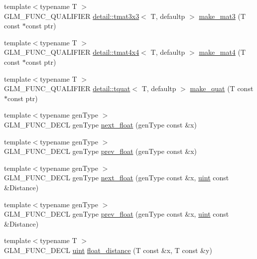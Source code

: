 \begin{DoxyCompactItemize}
\item 
{\footnotesize template$<$typename T $>$ }\\G\+L\+M\+\_\+\+F\+U\+N\+C\+\_\+\+Q\+U\+A\+L\+I\+F\+I\+ER \hyperlink{structglm_1_1detail_1_1tmat3x3}{detail\+::tmat3x3}$<$ T, defaultp $>$ \hyperlink{group__gtc__type__ptr_gae50ecac46eb8771fb074e310b602bf53}{make\+\_\+mat3} (T const $\ast$const ptr)
\item 
{\footnotesize template$<$typename T $>$ }\\G\+L\+M\+\_\+\+F\+U\+N\+C\+\_\+\+Q\+U\+A\+L\+I\+F\+I\+ER \hyperlink{structglm_1_1detail_1_1tmat4x4}{detail\+::tmat4x4}$<$ T, defaultp $>$ \hyperlink{group__gtc__type__ptr_gac3920fd61f0c459a4749b8eb9107982c}{make\+\_\+mat4} (T const $\ast$const ptr)
\item 
{\footnotesize template$<$typename T $>$ }\\G\+L\+M\+\_\+\+F\+U\+N\+C\+\_\+\+Q\+U\+A\+L\+I\+F\+I\+ER \hyperlink{structglm_1_1detail_1_1tquat}{detail\+::tquat}$<$ T, defaultp $>$ \hyperlink{group__gtc__type__ptr_ga051ec24a44af31a08b11eccbf8726b02}{make\+\_\+quat} (T const $\ast$const ptr)
\item 
{\footnotesize template$<$typename gen\+Type $>$ }\\G\+L\+M\+\_\+\+F\+U\+N\+C\+\_\+\+D\+E\+CL gen\+Type \hyperlink{group__gtc__ulp_gae516ae554faa6117660828240e8bdaf0}{next\+\_\+float} (gen\+Type const \&x)
\item 
{\footnotesize template$<$typename gen\+Type $>$ }\\G\+L\+M\+\_\+\+F\+U\+N\+C\+\_\+\+D\+E\+CL gen\+Type \hyperlink{group__gtc__ulp_ga2fcbb7bfbfc595712bfddc51b0715b07}{prev\+\_\+float} (gen\+Type const \&x)
\item 
{\footnotesize template$<$typename gen\+Type $>$ }\\G\+L\+M\+\_\+\+F\+U\+N\+C\+\_\+\+D\+E\+CL gen\+Type \hyperlink{group__gtc__ulp_gad107ec3d9697ef82032a33338a73ebdd}{next\+\_\+float} (gen\+Type const \&x, \hyperlink{group__core__precision_ga4fd29415871152bfb5abd588334147c8}{uint} const \&Distance)
\item 
{\footnotesize template$<$typename gen\+Type $>$ }\\G\+L\+M\+\_\+\+F\+U\+N\+C\+\_\+\+D\+E\+CL gen\+Type \hyperlink{group__gtc__ulp_gaa399d5b6472a70e8952f9b26ecaacdec}{prev\+\_\+float} (gen\+Type const \&x, \hyperlink{group__core__precision_ga4fd29415871152bfb5abd588334147c8}{uint} const \&Distance)
\item 
{\footnotesize template$<$typename T $>$ }\\G\+L\+M\+\_\+\+F\+U\+N\+C\+\_\+\+D\+E\+CL \hyperlink{group__core__precision_ga4fd29415871152bfb5abd588334147c8}{uint} \hyperlink{group__gtc__ulp_ga2e09bd6c8b0a9c91f6f5683d68245634}{float\+\_\+distance} (T const \&x, T const \&y)

\end{DoxyCompactItemize}
